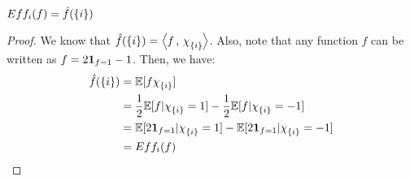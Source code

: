 \begin{lemma}
    $Eff_i(f) = \hat{f}(\{i\})$

    \begin{proof}
        We know that $\fhat(\{i\}) = \inn{f}{\chi_{\{i\}}}$. Also, note that any function $f$ can be written as $f = 2\mathbf{1}_{f = 1} - 1$. Then, we have:
        \begin{align*}
            \fhat(\{i\}) &= \E[f\chi_{\{i\}}]\\
                         &= \frac{1}{2} \E[f|\chi_{\{i\}} = 1] - \frac{1}{2} \E[f|\chi_{\{i\}} = -1]\\
                         &= \E[2\indicator_{f = 1}|\chi_{\{i\}} = 1] - \E[2\indicator_{f = 1}|\chi_{\{i\}} = -1]\\
                         &= Eff_i(f)
        \end{align*}    
    \end{proof}
\end{lemma}


